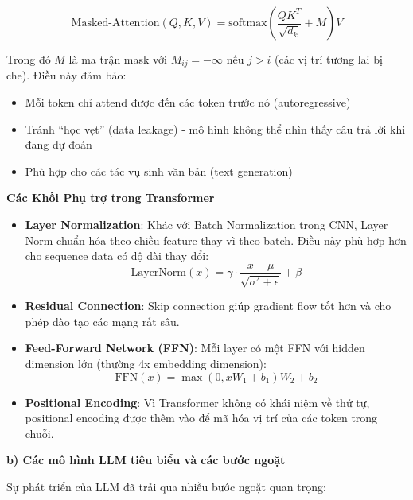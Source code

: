 \begin{equation}
\text{Masked-Attention}(Q, K, V) = \text{softmax}\left(\frac{QK^T}{\sqrt{d_k}} + M\right)V
\end{equation}

Trong đó $M$ là ma trận mask với $M_{ij} = -\infty$ nếu $j > i$ (các vị trí tương lai bị che). Điều này đảm bảo:
\begin{itemize}
    \item Mỗi token chỉ attend được đến các token trước nó (autoregressive)
    \item Tránh ``học vẹt'' (data leakage) - mô hình không thể nhìn thấy câu trả lời khi đang dự đoán
    \item Phù hợp cho các tác vụ sinh văn bản (text generation)
\end{itemize}

\textbf{Các Khối Phụ trợ trong Transformer}

\begin{itemize}
    \item \textbf{Layer Normalization}: Khác với Batch Normalization trong CNN, Layer Norm chuẩn hóa theo chiều feature thay vì theo batch. Điều này phù hợp hơn cho sequence data có độ dài thay đổi:
    \begin{equation}
    \text{LayerNorm}(x) = \gamma \cdot \frac{x - \mu}{\sqrt{\sigma^2 + \epsilon}} + \beta
    \end{equation}

    \item \textbf{Residual Connection}: Skip connection giúp gradient flow tốt hơn và cho phép đào tạo các mạng rất sâu.

    \item \textbf{Feed-Forward Network (FFN)}: Mỗi layer có một FFN với hidden dimension lớn (thường 4x embedding dimension):
    \begin{equation}
    \text{FFN}(x) = \max(0, xW_1 + b_1)W_2 + b_2
    \end{equation}

    \item \textbf{Positional Encoding}: Vì Transformer không có khái niệm về thứ tự, positional encoding được thêm vào để mã hóa vị trí của các token trong chuỗi.
\end{itemize}

\textbf{b) Các mô hình LLM tiêu biểu và các bước ngoặt}

Sự phát triển của LLM đã trải qua nhiều bước ngoặt quan trọng:

